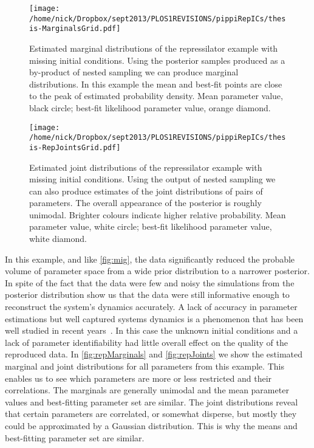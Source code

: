 \begin{figure*}[htbp]
    \texttt{[image: /home/nick/Dropbox/sept2013/PLOS1REVISIONS/pippiRepICs/thesis-MarginalsGrid.pdf]}
  \caption{Estimated marginal distributions of the repressilator example with missing initial conditions.
    Using the posterior samples produced as a by-product of nested sampling we can produce marginal distributions.
    In this example the mean and best-fit points are close to the peak of estimated probability density.
    Mean parameter value, black circle; best-fit likelihood parameter value, orange diamond.
  }
  \label{fig:repMarginals}
\end{figure*}
%
\begin{figure*}[htbp]
    \texttt{[image: /home/nick/Dropbox/sept2013/PLOS1REVISIONS/pippiRepICs/thesis-RepJointsGrid.pdf]}
  \caption{Estimated joint distributions of the repressilator example with missing initial conditions.
    Using the output of nested sampling we can also produce estimates of the joint distributions of pairs of parameters.
    The overall appearance of the posterior is roughly unimodal.
    Brighter colours indicate higher relative probability.
    Mean parameter value, white circle; best-fit likelihood parameter value, white diamond.
  }
  \label{fig:repJoints}
\end{figure*}

In this example, and like \autoref{fig:mig}, the data significantly reduced the probable volume of parameter space from a wide prior distribution to a narrower posterior.
In spite of the fact that the data were few and noisy the simulations from the posterior distribution show us that the data were still informative enough to reconstruct the system's dynamics accurately.
A lack of accuracy in parameter estimations but well captured systems dynamics is a phenomenon that has been well studied in recent years~\cite{gutenkunst2007,ashyraliyev2008,erguler2011}.
In this case the unknown initial conditions and a lack of parameter identifiability had little overall effect on the quality of the reproduced data.
In \autoref{fig:repMarginals} and \autoref{fig:repJoints} we show the estimated marginal and joint distributions for all parameters from this example.
This enables us to see which parameters are more or less restricted and their correlations.
The marginals are generally unimodal and the mean parameter values and best-fitting parameter set are similar.
The joint distributions reveal that certain parameters are correlated, or somewhat disperse, but mostly they could be approximated by a Gaussian distribution.
This is why the means and best-fitting parameter set are similar.

